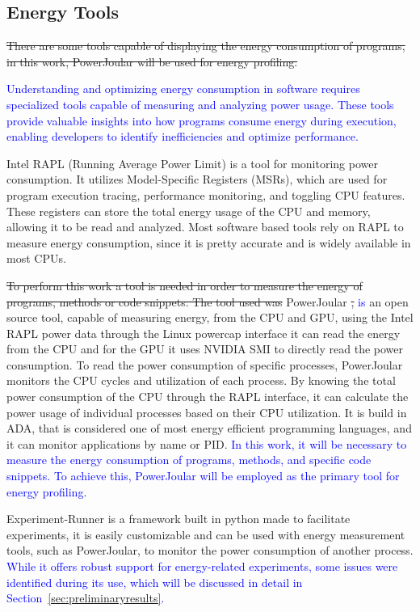 \documentclass[sigplan]{acmart}
\newcommand{\wnote}[1]{\textcolor{blue}{#1}}
\begin{document}
\subsection{Energy Tools} \label{sec:background_energy}

\st{There are some tools capable of displaying the energy consumption of programs, in this work, PowerJoular will be used for energy profiling.}

\wnote{Understanding and optimizing energy consumption in software requires specialized tools capable of measuring and analyzing power usage. These tools provide valuable insights into how programs consume energy during execution, enabling developers to identify inefficiencies and optimize performance. }

Intel RAPL (Running Average Power Limit)\cite{intel_rapl} is a tool for monitoring power consumption. It utilizes Model-Specific Registers (MSRs), which are used for program execution tracing, performance monitoring, and toggling CPU features. These registers can store the total energy usage of the CPU and memory, allowing it to be read and analyzed. Most software based tools rely on RAPL to measure energy consumption, since it is pretty accurate and is widely available in most CPUs.

\st{To perform this work a tool is needed in order to measure the energy of programs, methods or code snippets. The tool used was} PowerJoular \cite{noureddine-ie-2022} \st{,} \wnote{is} an open source tool, capable of measuring energy, from the CPU and GPU, using the Intel RAPL power data through the Linux powercap interface it can read the energy from the CPU and for the GPU it uses NVIDIA SMI to directly read the power consumption.
To read the power consumption of specific processes, PowerJoular monitors the CPU cycles and utilization of each process. By knowing the total power consumption of the CPU through the RAPL interface, it can calculate the power usage of individual processes based on their CPU utilization.
It is build in ADA, that is considered one of most energy efficient programming languages\cite{PEREIRA2021102609}, and it can monitor applications by name or PID. \wnote{In this work, it will be necessary to measure the energy consumption of programs, methods, and specific code snippets. To achieve this, PowerJoular will be employed as the primary tool for energy profiling.}

Experiment-Runner\cite{S2_Group_Experiment_Runner} is a framework built in python made to facilitate experiments, it is easily customizable and can be used with energy measurement tools, such as PowerJoular, to monitor the power consumption of another process. \wnote{While it offers robust support for energy-related experiments, some issues were identified during its use, which will be discussed in detail in Section~\ref{sec:preliminaryresults}.}
\end{document}
